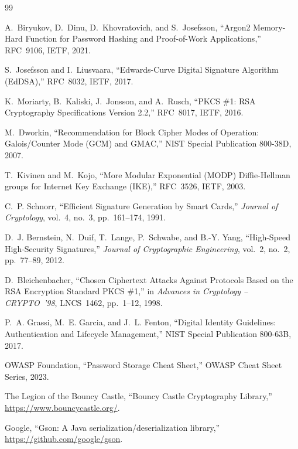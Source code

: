 \documentclass[11pt,a4paper]{article}
\begin{document}
\begin{thebibliography}{99}

A.~Biryukov, D.~Dinu, D.~Khovratovich, and S.~Josefsson,
``Argon2 Memory-Hard Function for Password Hashing and Proof-of-Work
Applications,'' RFC~9106, IETF, 2021.

S.~Josefsson and I.~Liusvaara,
``Edwards-Curve Digital Signature Algorithm (EdDSA),'' RFC~8032, IETF, 2017.

K.~Moriarty, B.~Kaliski, J.~Jonsson, and A.~Rusch,
``PKCS \#1: RSA Cryptography Specifications Version 2.2,'' RFC~8017, IETF, 2016.

M.~Dworkin,
``Recommendation for Block Cipher Modes of Operation: Galois/Counter Mode (GCM)
and GMAC,'' NIST Special Publication 800-38D, 2007.

T.~Kivinen and M.~Kojo,
``More Modular Exponential (MODP) Diffie-Hellman groups for Internet Key
Exchange (IKE),'' RFC~3526, IETF, 2003.

C.~P. Schnorr,
``Efficient Signature Generation by Smart Cards,''
\emph{Journal of Cryptology}, vol.~4, no.~3, pp.~161--174, 1991.

D.~J. Bernstein, N.~Duif, T.~Lange, P.~Schwabe, and B.-Y. Yang,
``High-Speed High-Security Signatures,''
\emph{Journal of Cryptographic Engineering}, vol.~2, no.~2, pp.~77--89, 2012.

D.~Bleichenbacher,
``Chosen Ciphertext Attacks Against Protocols Based on the RSA Encryption
Standard PKCS \#1,'' in \emph{Advances in Cryptology -- CRYPTO~'98},
LNCS~1462, pp.~1--12, 1998.

P.~A. Grassi, M.~E. Garcia, and J.~L. Fenton,
``Digital Identity Guidelines: Authentication and Lifecycle Management,''
NIST Special Publication 800-63B, 2017.

OWASP Foundation,
``Password Storage Cheat Sheet,'' OWASP Cheat Sheet Series, 2023.

The Legion of the Bouncy Castle,
``Bouncy Castle Cryptography Library,'' \url{https://www.bouncycastle.org/}.

Google,
``Gson: A Java serialization/deserialization library,'' 
\url{https://github.com/google/gson}.

\end{thebibliography}
\end{document}
